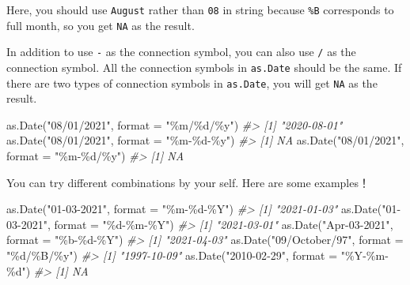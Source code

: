 \documentclass[
]{book}
\newenvironment{Shaded}{\begin{snugshade}}{\end{snugshade}}
\newcommand{\AttributeTok}[1]{\textcolor[rgb]{0.77,0.63,0.00}{#1}}
\newcommand{\CommentTok}[1]{\textcolor[rgb]{0.56,0.35,0.01}{\textit{#1}}}
\newcommand{\FunctionTok}[1]{\textcolor[rgb]{0.00,0.00,0.00}{#1}}
\newcommand{\NormalTok}[1]{#1}
\newcommand{\StringTok}[1]{\textcolor[rgb]{0.31,0.60,0.02}{#1}}
\begin{document}
Here, you should use \texttt{August} rather than \texttt{08} in string because \texttt{\%B} corresponds to full month, so you get \texttt{NA} as the result.

In addition to use \texttt{-} as the connection symbol, you can also use \texttt{/} as the connection symbol. All the connection symbols in \texttt{as.Date} should be the same. If there are two types of connection symbols in \texttt{as.Date}, you will get \texttt{NA} as the result.

\begin{Shaded}
\begin{Highlighting}[]
\FunctionTok{as.Date}\NormalTok{(}\StringTok{"08/01/2021"}\NormalTok{, }\AttributeTok{format =} \StringTok{"\%m/\%d/\%y"}\NormalTok{)}
\CommentTok{\#\textgreater{} [1] "2020{-}08{-}01"}
\FunctionTok{as.Date}\NormalTok{(}\StringTok{"08/01/2021"}\NormalTok{, }\AttributeTok{format =} \StringTok{"\%m{-}\%d{-}\%y"}\NormalTok{)}
\CommentTok{\#\textgreater{} [1] NA}
\FunctionTok{as.Date}\NormalTok{(}\StringTok{"08/01/2021"}\NormalTok{, }\AttributeTok{format =} \StringTok{"\%m{-}\%d/\%y"}\NormalTok{)}
\CommentTok{\#\textgreater{} [1] NA}
\end{Highlighting}
\end{Shaded}

You can try different combinations by your self. Here are some examples！

\begin{Shaded}
\begin{Highlighting}[]
\FunctionTok{as.Date}\NormalTok{(}\StringTok{"01{-}03{-}2021"}\NormalTok{, }\AttributeTok{format =} \StringTok{"\%m{-}\%d{-}\%Y"}\NormalTok{)}
\CommentTok{\#\textgreater{} [1] "2021{-}01{-}03"}
\FunctionTok{as.Date}\NormalTok{(}\StringTok{"01{-}03{-}2021"}\NormalTok{, }\AttributeTok{format =} \StringTok{"\%d{-}\%m{-}\%Y"}\NormalTok{)}
\CommentTok{\#\textgreater{} [1] "2021{-}03{-}01"}
\FunctionTok{as.Date}\NormalTok{(}\StringTok{"Apr{-}03{-}2021"}\NormalTok{, }\AttributeTok{format =} \StringTok{"\%b{-}\%d{-}\%Y"}\NormalTok{)}
\CommentTok{\#\textgreater{} [1] "2021{-}04{-}03"}
\FunctionTok{as.Date}\NormalTok{(}\StringTok{"09/October/97"}\NormalTok{, }\AttributeTok{format =} \StringTok{"\%d/\%B/\%y"}\NormalTok{)}
\CommentTok{\#\textgreater{} [1] "1997{-}10{-}09"}
\FunctionTok{as.Date}\NormalTok{(}\StringTok{"2010{-}02{-}29"}\NormalTok{, }\AttributeTok{format =} \StringTok{"\%Y{-}\%m{-}\%d"}\NormalTok{)}
\CommentTok{\#\textgreater{} [1] NA}
\end{Highlighting}
\end{Shaded}
\end{document}
